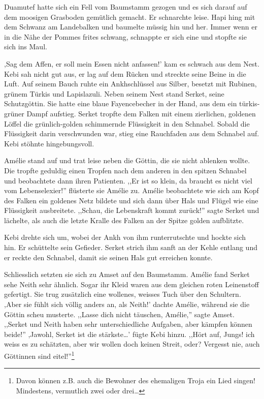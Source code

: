 \documentclass[11pt,titlepage,a5paper]{book}
\begin{document}
Duamutef hatte sich ein Fell vom Baumstamm gezogen und es sich darauf auf dem moosigen Grasboden gemütlich gemacht. Er schnarchte leise. Hapi hing mit dem Schwanz am Landebalken und baumelte müssig hin und her. Immer wenn er in die Nähe der Pommes frites schwang, schnappte er sich eine und stopfte sie sich ins Maul.

,Sag dem Affen, er soll mein Essen nicht anfassen!' kam es schwach aus dem Nest. Kebi sah nicht gut aus, er lag auf dem Rücken und streckte seine Beine in die Luft. Auf seinem Bauch ruhte ein Ankhschlüssel aus Silber, besetzt mit Rubinen, grünem Türkis und Lapislazuli.  Neben seinem Nest stand Serket, seine Schutzgöttin. Sie hatte eine blaue Fayencebecher in der Hand, aus dem ein türkis-grüner Dampf aufstieg. Serket tropfte dem Falken mit einem zierlichen, goldenen Löffel die grünlich-golden schimmernde Flüssigkeit in den Schnabel. Sobald die Flüssigkeit darin verschwunden war, stieg eine Rauchfaden aus dem Schnabel auf. Kebi stöhnte hingebungsvoll.

Amélie stand auf und trat leise neben die Göttin, die sie nicht ablenken wollte. Die tropfte geduldig einen Tropfen nach dem anderen in den spitzen Schnabel und beobachtete dann ihren Patienten. ,,Er ist so klein, da braucht es nicht viel vom Lebenselexier!'' flüsterte sie Amélie zu. Amélie beobachtete wie  sich am Kopf des Falken ein goldenes Netz bildete und sich dann über Hals und Flügel wie eine Flüssigkeit ausbreitete. ,,Schau, die Lebenskraft kommt zurück!'' sagte Serket und lächelte, als auch die letzte Kralle des Falken an der Spitze golden aufblitzte.

Kebi drehte sich um, wobei der Ankh von ihm runterrutschte und hockte sich hin. Er schüttelte sein Gefieder. Serket strich ihm sanft an der Kehle entlang und er reckte den Schnabel, damit sie seinen Hals gut erreichen konnte.

Schliesslich setzten sie sich zu Amset auf den Baumstamm. Amélie fand Serket sehe Neith sehr ähnlich. Sogar ihr Kleid waren aus dem gleichen roten Leinenstoff gefertigt. Sie trug zusätzlich eine wollenes, weisses Tuch über den Schultern. ,Aber sie fühlt sich völlig anders an, als Neith!' dachte Amélie, während sie die Göttin scheu musterte. ,,Lasse dich nicht täuschen, Amélie,'' sagte Amset. ,,Serket und Neith haben sehr unterschiedliche Aufgaben, aber kämpfen können beide!'' ,Jawohl, Serket ist die stärkste\dots' fügte Kebi hinzu. ,,Hört auf, Jungs! ich weiss es zu schätzten, aber wir wollen doch keinen Streit, oder? Vergesst nie, auch Göttinnen sind eitel!''\footnote{Davon können z.B. auch die Bewohner des ehemaligen Troja ein Lied singen! Mindestens, vermutlich zwei oder drei\dots}
\end{document}
